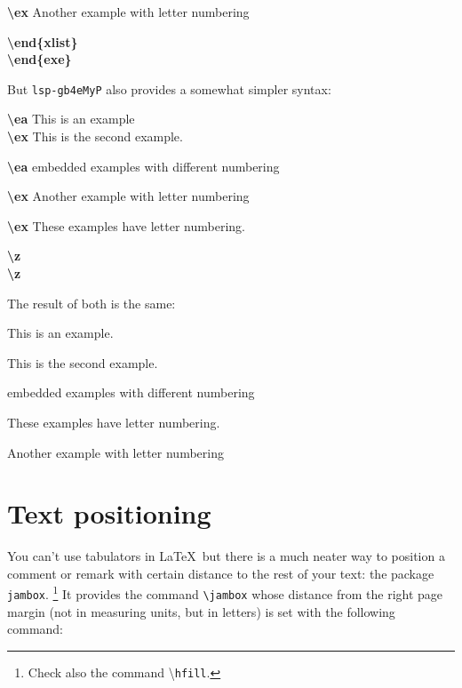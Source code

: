 \textbf{\textbackslash ex} Another example with letter numbering

\textbf{\textbackslash end\{xlist\}}\\
\textbf{\textbackslash end\{exe\}}


But \texttt{lsp-gb4eMyP} also provides a somewhat simpler syntax:

\smallskip

\noindent\textbf{\textbackslash ea} This is an example\\
\textbf{\textbackslash ex} This is the second example.

\textbf{\textbackslash ea} embedded examples with different numbering

\textbf{\textbackslash ex} Another example with letter numbering

\textbf{\textbackslash ex} These examples have letter numbering.

\textbf{\textbackslash z}\\
\textbf{\textbackslash z}

\medskip

The result of both is the same:

\ea\label{ex:1} This is an example.

\ex This is the second example.

	\ea embedded examples with different numbering
	
	\ex These examples have letter numbering.
	
	\ex Another example with letter numbering
	\z   
\z




\section{Text positioning}
\label{ch:TextPositioning}


\settowidth{}

You can't use tabulators in \LaTeX\, but there is a much neater way to position a comment or remark with certain distance to the rest of your text: the package \texttt{jambox}.%
	\footnote{Check also the command \textbackslash \texttt{hfill}.} %
 It provides the command \texttt{\textbackslash jambox} whose distance from the right page margin (not in measuring units, but in letters) is set with the following command:

